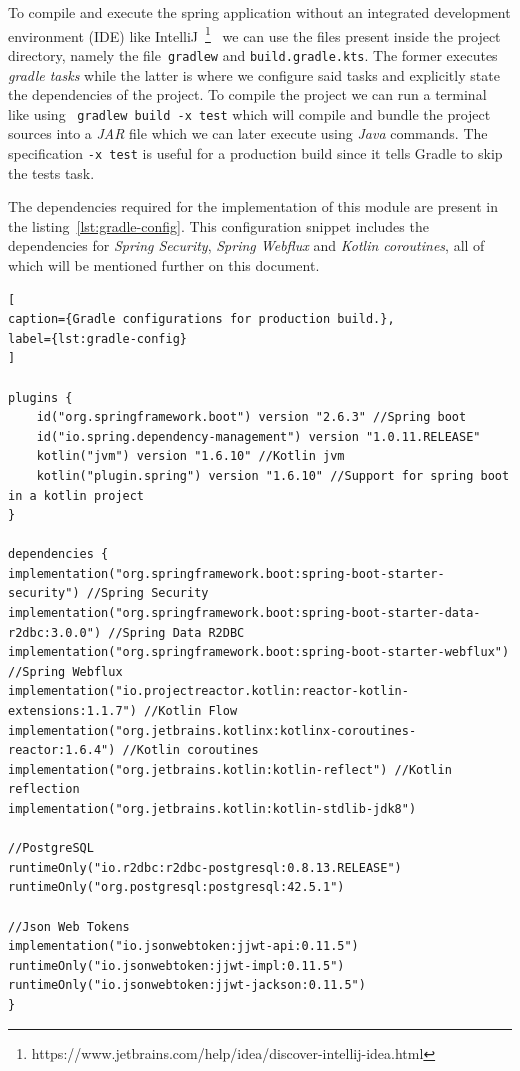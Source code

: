 To compile and execute the spring application without an integrated development environment (IDE) like IntelliJ~\footnote{https://www.jetbrains.com/help/idea/discover-intellij-idea.html}~\label{fn:intellij} we can use the files present inside the project directory, namely the file~\lstinline{gradlew} and \lstinline{build.gradle.kts}. The former executes \textit{gradle tasks} while the latter is where we configure said tasks and explicitly state the dependencies of the project. 
To compile the project we can run a terminal like using ~\lstinline{gradlew build -x test} which will compile and bundle the project sources into a \textit{JAR} file which we can later execute using \textit{Java} commands. The specification \lstinline{-x test} is useful for a production build since it tells Gradle to skip the tests task.

The dependencies required for the implementation of this module are present in the listing~\ref{lst:gradle-config}. This configuration snippet includes the dependencies for \textit{Spring Security}, \textit{Spring Webflux} and \textit{Kotlin coroutines}, all of which will be mentioned further on this document.

\begin{lstlisting}[
caption={Gradle configurations for production build.},
label={lst:gradle-config}
]

plugins {
	id("org.springframework.boot") version "2.6.3" //Spring boot
	id("io.spring.dependency-management") version "1.0.11.RELEASE" 
	kotlin("jvm") version "1.6.10" //Kotlin jvm
	kotlin("plugin.spring") version "1.6.10" //Support for spring boot in a kotlin project 
}

dependencies {
implementation("org.springframework.boot:spring-boot-starter-security") //Spring Security
implementation("org.springframework.boot:spring-boot-starter-data-r2dbc:3.0.0") //Spring Data R2DBC
implementation("org.springframework.boot:spring-boot-starter-webflux") //Spring Webflux
implementation("io.projectreactor.kotlin:reactor-kotlin-extensions:1.1.7") //Kotlin Flow
implementation("org.jetbrains.kotlinx:kotlinx-coroutines-reactor:1.6.4") //Kotlin coroutines
implementation("org.jetbrains.kotlin:kotlin-reflect") //Kotlin reflection
implementation("org.jetbrains.kotlin:kotlin-stdlib-jdk8")

//PostgreSQL
runtimeOnly("io.r2dbc:r2dbc-postgresql:0.8.13.RELEASE")
runtimeOnly("org.postgresql:postgresql:42.5.1")

//Json Web Tokens
implementation("io.jsonwebtoken:jjwt-api:0.11.5")
runtimeOnly("io.jsonwebtoken:jjwt-impl:0.11.5")
runtimeOnly("io.jsonwebtoken:jjwt-jackson:0.11.5")
}
\end{lstlisting}

